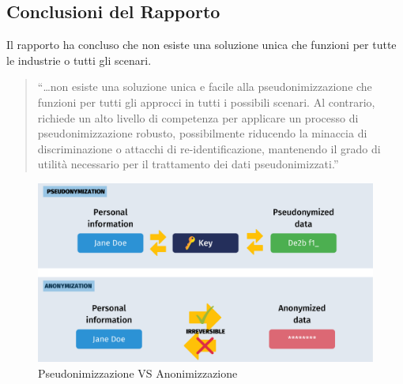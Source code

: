 \subsection{Conclusioni del Rapporto}
Il rapporto ha concluso che non esiste una soluzione unica che funzioni per tutte le industrie o tutti gli scenari.

\begin{quote}
“…non esiste una soluzione unica e facile alla pseudonimizzazione che funzioni per tutti gli approcci in tutti i possibili scenari. Al contrario, richiede un alto livello di competenza per applicare un processo di pseudonimizzazione robusto, possibilmente riducendo la minaccia di discriminazione o attacchi di re-identificazione, mantenendo il grado di utilità necessario per il trattamento dei dati pseudonimizzati.”
\end{quote}

\begin{figure}[H]
    \centering
    \includegraphics[width=0.8\linewidth]{Images/Difference-between-anonymization-and-pseudonymization.png}
    \caption{Pseudonimizzazione VS Anonimizzazione}
    \label{fig:enter-label}
\end{figure}
